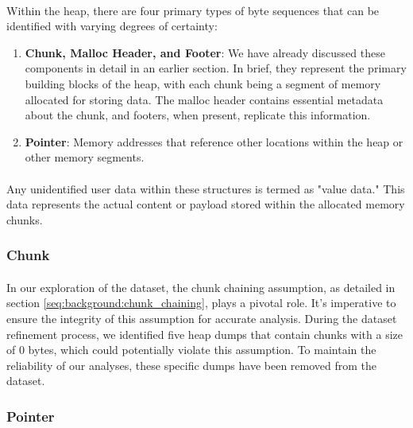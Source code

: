         \paragraph{}Within the heap, there are four primary types of byte sequences that can be identified with varying degrees of certainty:
        
        \begin{enumerate}
            \item \textbf{Chunk, Malloc Header, and Footer}: We have already discussed these components in detail in an earlier section. In brief, they represent the primary building blocks of the heap, with each chunk being a segment of memory allocated for storing data. The malloc header contains essential metadata about the chunk, and footers, when present, replicate this information.
            \item \textbf{Pointer}: Memory addresses that reference other locations within the heap or other memory segments.
        \end{enumerate}
        
        \paragraph{}Any unidentified user data within these structures is termed as "value data." This data represents the actual content or payload stored within the allocated memory chunks.

        \subsubsection{Chunk}
        \paragraph{}In our exploration of the dataset, the chunk chaining assumption, as detailed in section \ref{seq:background:chunk_chaining}, plays a pivotal role. It's imperative to ensure the integrity of this assumption for accurate analysis. During the dataset refinement process, we identified five heap dumps that contain chunks with a size of 0 bytes, which could potentially violate this assumption. To maintain the reliability of our analyses, these specific dumps have been removed from the dataset. 
        
        \subsubsection{Pointer}\label{seq:methods:dataset:pointer}

